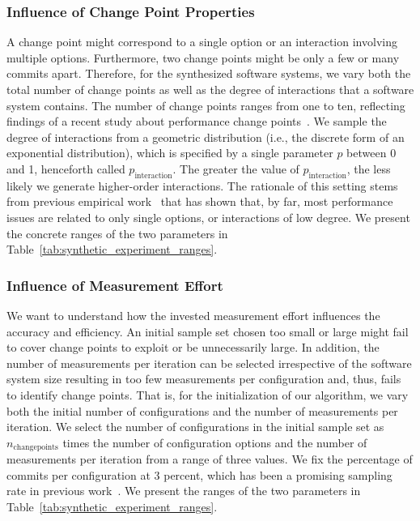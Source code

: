 \documentclass[sigconf]{acmart}
\begin{document}
	\subsubsection{Influence of Change Point Properties}
	A change point might correspond to a single option or an interaction involving multiple options. Furthermore, two change points might be only a few or many commits apart. Therefore, for the synthesized software systems, we vary both the total number of change points as well as the degree of interactions that a software system contains. The number of change points ranges from one to ten, reflecting findings of a recent study about performance change points~\cite{muhlbauer_accurate_2019}. We sample the degree of interactions from a geometric distribution (i.e., the discrete form of an exponential distribution), which is specified by a single parameter $p$ between 0 and 1, henceforth called $p_\text{interaction}$. The greater the value of $p_\text{interaction}$, the less likely we generate higher-order interactions. The rationale of this setting stems from previous empirical work~\cite{medeiros_comparison_2016,kolesnikov_tradeoffs_2019} that has shown that, by far, most performance issues are related to only single options, or interactions of low degree. We present the concrete ranges of the two parameters in Table~\ref{tab:synthetic_experiment_ranges}.
	
	\subsubsection{Influence of Measurement Effort}
	We want to understand how the invested measurement effort influences the accuracy and efficiency. An initial sample set chosen too small or large might fail to cover change points to exploit or be unnecessarily large. In addition, the number of measurements per iteration can be selected irrespective of the software system size resulting in too few measurements per configuration and, thus, fails to identify change points. That is, for the initialization of our algorithm, we vary both the initial number of configurations and the number of measurements per iteration. We select the number of configurations in the initial sample set as $n_\text{changepoints}$ times the number of configuration options and the number of measurements per iteration from a range of three values. We fix the percentage of commits per configuration at 3 percent, which has been a promising sampling rate in previous work~\cite{muhlbauer_accurate_2019}. 
	We present the ranges of the two parameters in Table~\ref{tab:synthetic_experiment_ranges}.
\end{document}
